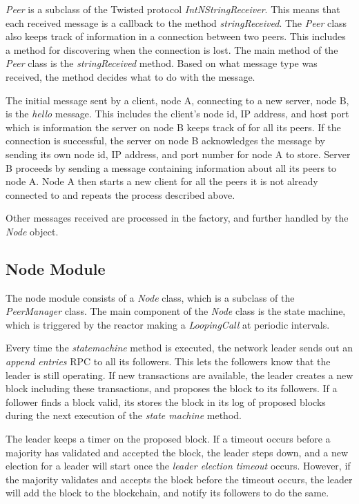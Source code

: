 \textit{Peer} is a subclass of the Twisted protocol \textit{IntNStringReceiver}. This means that each received message is a callback to the method \textit{stringReceived}. The \textit{Peer} class also keeps track of information in a connection between two peers. This includes a method for discovering when the connection is lost. The main method of the \textit{Peer} class is the \textit{stringReceived} method. Based on what message type was received, the method decides what to do with the message. 

The initial message sent by a client, node A, connecting to a new server, node B, is the \textit{hello} message. This includes the client's node id, IP address, and host port which is information the server on node B keeps track of for all its peers. If the connection is successful, the server on node B acknowledges the message by sending its own node id, IP address, and port number for node A to store. Server B proceeds by sending a message containing information about all its peers to node A. Node A then starts a new client for all the peers it is not already connected to and repeats the process described above. 

Other messages received are processed in the factory, and further handled by the \textit{Node} object.


\subsection{Node Module}
The node module consists of a \textit{Node} class, which is a subclass of the \textit{PeerManager} class. The main component of the \textit{Node} class is the state machine, which is triggered by the reactor making a \textit{LoopingCall} at periodic intervals. 

Every time the \textit{state\textunderscore machine} method is executed, the network leader sends out an \textit{append entries} RPC to all its followers. This lets the followers know that the leader is still operating. If new transactions are available, the leader creates a new block including these transactions, and proposes the block to its followers. If a follower finds a block valid, its stores the block in its log of proposed blocks during the next execution of the \textit{state machine} method. 

The leader keeps a timer on the proposed block. If a timeout occurs before a majority has validated and accepted the block, the leader steps down, and a new election for a leader will start once the \textit{leader election timeout} occurs. However, if the majority validates and accepts the block before the timeout occurs, the leader will add the block to the blockchain, and notify its followers to do the same. 


